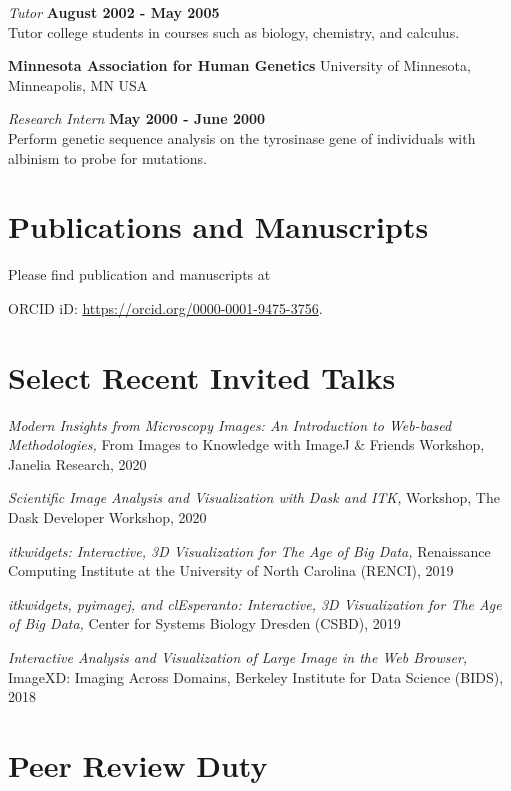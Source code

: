 \documentclass[margin,line]{res}
\begin{document}
\begin{resume}
\vspace{-.3cm}
{\em Tutor} \hfill {\bf August 2002 - May 2005} \\
Tutor college students in courses such as biology, chemistry, and calculus.

{\bf Minnesota Association for Human Genetics} University of Minnesota, Minneapolis, MN USA

\vspace{-.3cm}
{\em Research Intern} \hfill {\bf May 2000 - June 2000} \\
Perform genetic sequence analysis on the tyrosinase gene of individuals with albinism to probe for mutations.

\section{\sc Publications and Manuscripts}

Please find publication and manuscripts at

\begin{center}
ORCID iD: \url{https://orcid.org/0000-0001-9475-3756}.
\end{center}

\section{\sc Select Recent Invited Talks}

\textit{Modern Insights from Microscopy Images: An Introduction to Web-based
Methodologies,} From Images to Knowledge with ImageJ \& Friends Workshop,
Janelia Research, 2020

\textit{Scientific Image Analysis and Visualization with Dask and ITK,} Workshop, The Dask Developer Workshop, 2020

\textit{itkwidgets: Interactive, 3D Visualization for The Age of Big Data,}
Renaissance Computing Institute at the University of North Carolina (RENCI), 2019

\textit{itkwidgets, pyimagej, and clEsperanto: Interactive, 3D Visualization
for The Age of Big Data,} Center for Systems Biology Dresden (CSBD), 2019

\textit{Interactive Analysis and Visualization of Large Image in the Web
Browser,} ImageXD: Imaging Across Domains, Berkeley Institute for Data Science (BIDS), 2018



\section{\sc Peer Review Duty}


\end{resume}
\end{document}
